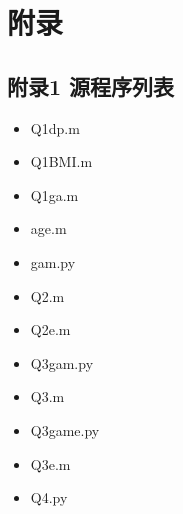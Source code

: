 \documentclass[12pt]{ctexart}
\begin{document}
	\newpage
	\section*{附录}
	\subsection*{附录1 源程序列表}
		\begin{itemize}[noitemsep, topsep=0pt, parsep=0pt, partopsep=0pt, leftmargin=1.5em]
		\item Q1dp.m
		\item Q1BMI.m
		\item Q1ga.m
		\item age.m
		\item gam.py
		\item Q2.m
		\item Q2e.m
		\item Q3gam.py
		\item Q3.m
		\item Q3game.py
		\item Q3e.m
		\item Q4.py
	\end{itemize}
\end{document}
